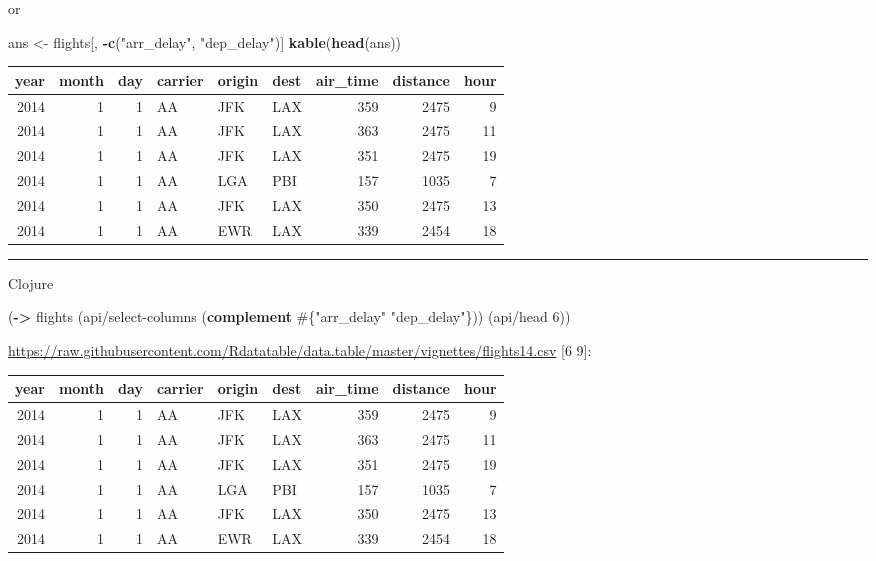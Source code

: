 \documentclass[]{article}
\newenvironment{Shaded}{\begin{snugshade}}{\end{snugshade}}
\newcommand{\KeywordTok}[1]{\textcolor[rgb]{0.13,0.29,0.53}{\textbf{#1}}}
\newcommand{\DecValTok}[1]{\textcolor[rgb]{0.00,0.00,0.81}{#1}}
\newcommand{\StringTok}[1]{\textcolor[rgb]{0.31,0.60,0.02}{#1}}
\newcommand{\OperatorTok}[1]{\textcolor[rgb]{0.81,0.36,0.00}{\textbf{#1}}}
\newcommand{\NormalTok}[1]{#1}
\begin{document}
or

\begin{Shaded}
\begin{Highlighting}[]
\NormalTok{ans <-}\StringTok{ }\NormalTok{flights[, }\OperatorTok{-}\KeywordTok{c}\NormalTok{(}\StringTok{"arr_delay"}\NormalTok{, }\StringTok{"dep_delay"}\NormalTok{)]}
\KeywordTok{kable}\NormalTok{(}\KeywordTok{head}\NormalTok{(ans))}
\end{Highlighting}
\end{Shaded}

\begin{longtable}[]{@{}rrrlllrrr@{}}
\toprule
year & month & day & carrier & origin & dest & air\_time & distance &
hour\tabularnewline
\midrule
\endhead
2014 & 1 & 1 & AA & JFK & LAX & 359 & 2475 & 9\tabularnewline
2014 & 1 & 1 & AA & JFK & LAX & 363 & 2475 & 11\tabularnewline
2014 & 1 & 1 & AA & JFK & LAX & 351 & 2475 & 19\tabularnewline
2014 & 1 & 1 & AA & LGA & PBI & 157 & 1035 & 7\tabularnewline
2014 & 1 & 1 & AA & JFK & LAX & 350 & 2475 & 13\tabularnewline
2014 & 1 & 1 & AA & EWR & LAX & 339 & 2454 & 18\tabularnewline
\bottomrule
\end{longtable}

\begin{center}\rule{0.5\linewidth}{0.5pt}\end{center}

Clojure

\begin{Shaded}
\begin{Highlighting}[]
\NormalTok{(}\KeywordTok{->}\NormalTok{ flights}
\NormalTok{    (api/select-columns (}\KeywordTok{complement}\NormalTok{ #\{}\StringTok{"arr_delay"} \StringTok{"dep_delay"}\NormalTok{\}))}
\NormalTok{    (api/head }\DecValTok{6}\NormalTok{))}
\end{Highlighting}
\end{Shaded}

\url{https://raw.githubusercontent.com/Rdatatable/data.table/master/vignettes/flights14.csv}
{[}6 9{]}:

\begin{longtable}[]{@{}rrrlllrrr@{}}
\toprule
year & month & day & carrier & origin & dest & air\_time & distance &
hour\tabularnewline
\midrule
\endhead
2014 & 1 & 1 & AA & JFK & LAX & 359 & 2475 & 9\tabularnewline
2014 & 1 & 1 & AA & JFK & LAX & 363 & 2475 & 11\tabularnewline
2014 & 1 & 1 & AA & JFK & LAX & 351 & 2475 & 19\tabularnewline
2014 & 1 & 1 & AA & LGA & PBI & 157 & 1035 & 7\tabularnewline
2014 & 1 & 1 & AA & JFK & LAX & 350 & 2475 & 13\tabularnewline
2014 & 1 & 1 & AA & EWR & LAX & 339 & 2454 & 18\tabularnewline
\bottomrule
\end{longtable}
\end{document}
